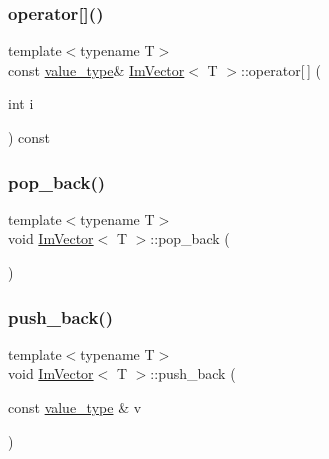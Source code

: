 \hypertarget{class_im_vector_ab97c3f6f1943602e36afb593c6f03ff1}{}\label{class_im_vector_ab97c3f6f1943602e36afb593c6f03ff1} 
\subsubsection{\texorpdfstring{operator[]()}{operator[]()}\hspace{0.1cm}{\footnotesize\ttfamily [2/2]}}
{\footnotesize\ttfamily template$<$typename T$>$ \\
const \hyperlink{class_im_vector_a8bd77e4e7581d8e5f9e98d7c2f3c2a80}{value\+\_\+type}\& \hyperlink{class_im_vector}{Im\+Vector}$<$ T $>$\+::operator\mbox{[}$\,$\mbox{]} (\begin{DoxyParamCaption}\item[{int}]{i }\end{DoxyParamCaption}) const}

\hypertarget{class_im_vector_a3db7ce62d3c429effdb893fbf7148c1c}{}\label{class_im_vector_a3db7ce62d3c429effdb893fbf7148c1c} 
\subsubsection{\texorpdfstring{pop\+\_\+back()}{pop\_back()}}
{\footnotesize\ttfamily template$<$typename T$>$ \\
void \hyperlink{class_im_vector}{Im\+Vector}$<$ T $>$\+::pop\+\_\+back (\begin{DoxyParamCaption}{ }\end{DoxyParamCaption})}

\hypertarget{class_im_vector_a68387993f2a5f5c3b2a7139d9ab778b8}{}\label{class_im_vector_a68387993f2a5f5c3b2a7139d9ab778b8} 
\subsubsection{\texorpdfstring{push\+\_\+back()}{push\_back()}}
{\footnotesize\ttfamily template$<$typename T$>$ \\
void \hyperlink{class_im_vector}{Im\+Vector}$<$ T $>$\+::push\+\_\+back (\begin{DoxyParamCaption}\item[{const \hyperlink{class_im_vector_a8bd77e4e7581d8e5f9e98d7c2f3c2a80}{value\+\_\+type} \&}]{v }\end{DoxyParamCaption})}

